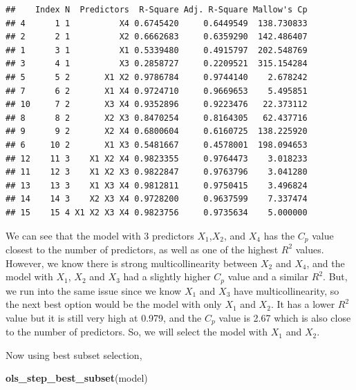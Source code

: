\documentclass[
  11pt,
]{article}
\newenvironment{Shaded}{\begin{snugshade}}{\end{snugshade}}
\newcommand{\FunctionTok}[1]{\textcolor[rgb]{0.13,0.29,0.53}{\textbf{#1}}}
\newcommand{\NormalTok}[1]{#1}
\begin{document}
\begin{verbatim}
##    Index N  Predictors  R-Square Adj. R-Square Mallow's Cp
## 4      1 1          X4 0.6745420     0.6449549  138.730833
## 2      2 1          X2 0.6662683     0.6359290  142.486407
## 1      3 1          X1 0.5339480     0.4915797  202.548769
## 3      4 1          X3 0.2858727     0.2209521  315.154284
## 5      5 2       X1 X2 0.9786784     0.9744140    2.678242
## 7      6 2       X1 X4 0.9724710     0.9669653    5.495851
## 10     7 2       X3 X4 0.9352896     0.9223476   22.373112
## 8      8 2       X2 X3 0.8470254     0.8164305   62.437716
## 9      9 2       X2 X4 0.6800604     0.6160725  138.225920
## 6     10 2       X1 X3 0.5481667     0.4578001  198.094653
## 12    11 3    X1 X2 X4 0.9823355     0.9764473    3.018233
## 11    12 3    X1 X2 X3 0.9822847     0.9763796    3.041280
## 13    13 3    X1 X3 X4 0.9812811     0.9750415    3.496824
## 14    14 3    X2 X3 X4 0.9728200     0.9637599    7.337474
## 15    15 4 X1 X2 X3 X4 0.9823756     0.9735634    5.000000
\end{verbatim}

We can see that the model with 3 predictors \(X_1\),\(X_2\), and \(X_4\)
has the \(C_p\) value closest to the number of predictors, as well as
one of the highest \(R^2\) values. However, we know there is strong
multicollinearity between \(X_2\) and \(X_4\), and the model with
\(X_1\), \(X_2\) and \(X_3\) had a slightly higher \(C_p\) value and a
similar \(R^2\). But, we run into the same issue since we know \(X_1\)
and \(X_3\) have multicollinearity, so the next best option would be the
model with only \(X_1\) and \(X_2\). It has a lower \(R^2\) value but it
is still very high at 0.979, and the \(C_p\) value is 2.67 which is also
close to the number of predictors. So, we will select the model with
\(X_1\) and \(X_2\).

Now using best subset selection,

\begin{Shaded}
\begin{Highlighting}[]
\FunctionTok{ols\_step\_best\_subset}\NormalTok{(model)}
\end{Highlighting}
\end{Shaded}
\end{document}
